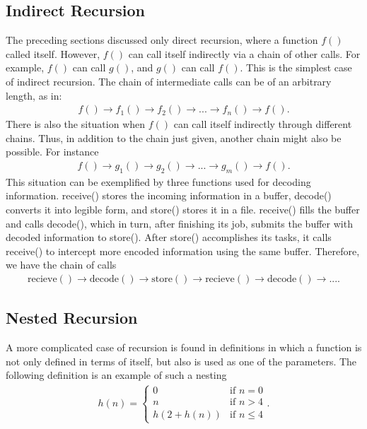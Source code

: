 \documentclass{report}
\begin{document}
    \subsection{Indirect Recursion}
    \bigbreak \noindent 
    The preceding sections discussed only direct recursion, where a function $f()$ called itself. However, $f()$ can call itself indirectly via a chain of other calls. For example, $f()$ can call $g()$, and $g()$ can call $f()$. This is the simplest case of indirect recursion. The chain of intermediate calls can be of an arbitrary length, as in:
    \begin{align*}
        f() \to f_{1}() \to f_{2}() \to ... \to f_{n}() \to f()
    .\end{align*}
    \bigbreak \noindent 
    There is also the situation when $f()$ can call itself indirectly through different chains. Thus, in addition to the chain just given, another chain might also be possible. For instance
    \begin{align*}
        f() \to g_{1}() \to g_{2}() \to ... \to g_{m}() \to f()
    .\end{align*}
    \bigbreak \noindent 
    This situation can be exemplified by three functions used for decoding information. receive() stores the incoming information in a buffer, decode() converts it into legible form, and store() stores it in a file. receive() fills the buffer and calls decode(), which in turn, after finishing its job, submits the buffer with decoded information to store(). After store() accomplishes its tasks, it calls receive() to intercept more encoded information using the same buffer. Therefore, we have the chain of calls
    \begin{align*}
        \text{recieve}() \to \text{decode}() \to \text{store}() \to \text{recieve}() \to \text{decode}() \to ...
    .\end{align*}
    \bigbreak \noindent 
    \pagebreak 
    \subsection{Nested Recursion}
    \bigbreak \noindent 
    A more complicated case of recursion is found in definitions in which a function is
    not only defined in terms of itself, but also is used as one of the parameters. The following definition is an example of such a nesting
    \begin{align*}
        h(n) = 
        \begin{cases}
            0 & \text{if } n = 0 \\
            n & \text{if } n > 4 \\
            h(2 + h(n)) & \text{if } n \leq 4
        \end{cases}
    .\end{align*}
    \bigbreak \noindent 
\end{document}
